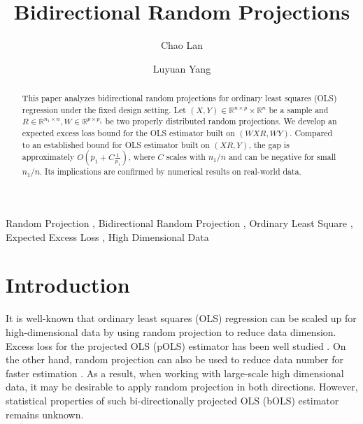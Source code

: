 \documentclass[a4paper,fleqn]{cas-sc}
\theoremstyle{plain}
\newcommand{\R}{\mathbb{R}}
\begin{document}
\let\WriteBookmarks\relax
\def\floatpagepagefraction{1}
\def\textpagefraction{.001}

\title[mode=title]{Bidirectional Random Projections} 
\shortauthors{}

\author[1]{Chao Lan}
\author[1]{Luyuan Yang}

\begin{abstract}
This paper analyzes  
bidirectional random 
projections for ordinary 
least squares (OLS) regression 
under the fixed design setting. 
Let $(X,Y) \in \R^{n \times p} 
\times \R^n$ be a sample and 
$R \in \R^{n_1 \times n}, 
W \in \R^{p \times p_1}$ be 
two properly distributed 
random projections. 
We develop an expected excess 
loss bound for the OLS estimator 
built on $(WXR, WY)$. Compared 
to an established bound for 
OLS estimator built on $(XR, Y)$, 
the gap is approximately $O\left( p_1 
+ C \frac{1}{p_1} \right)$, 
where $C$ scales with $n_1/n$ 
and can be negative for small $n_1/n$. 
Its implications are confirmed 
by numerical results on 
real-world data. 
\end{abstract}

\begin{keywords}
Random Projection \sep 
Bidirectional Random Projection \sep 
Ordinary Least Square \sep 
Expected Excess Loss \sep 
High Dimensional Data 
\end{keywords}


\maketitle


\section{Introduction}

It is well-known that 
ordinary least squares (OLS) regression 
can be scaled up for high-dimensional data 
by using random projection to reduce 
data dimension. Excess loss for 
the projected OLS (pOLS) estimator has been well studied 
\citep{maillard2009compressed,fard2012compressed,kaban2014new,slawski2017compressed}. 
On the other hand, random projection 
can also be used to reduce data number 
for faster estimation 
\citep{zhou2007compressed}. As a result, 
when working with large-scale high 
dimensional data, it may be desirable to 
apply random projection in both directions. 
However, statistical properties of such 
bi-directionally projected OLS (bOLS) 
estimator remains unknown. 
\end{document}
